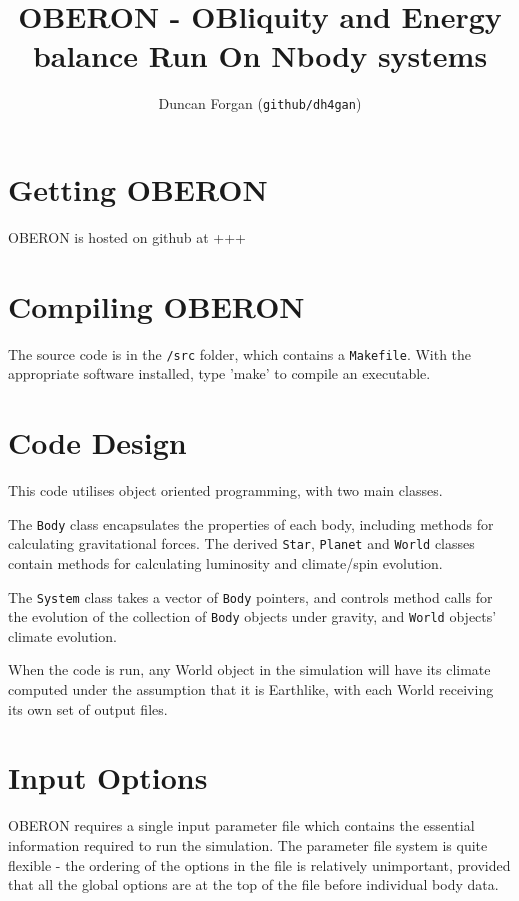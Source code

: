\documentclass[usenatbib,11pt]{article}
\begin{document}
\title{OBERON - OBliquity and Energy balance Run On Nbody systems}
\author{Duncan Forgan (\texttt{github/dh4gan})}
\maketitle

\newpage
\tableofcontents
\newpage

\section{Getting OBERON}

\noindent OBERON is hosted on github at +++

\section{Compiling OBERON}

\noindent The source code is in the \texttt{/src} folder, which contains a \texttt{Makefile}.  With the appropriate software installed, type 'make' to compile an executable.


\section{Code Design}

This code utilises object oriented programming, with two main classes.

The \texttt{Body} class encapsulates the properties of each body, including methods for calculating gravitational forces.  The derived \texttt{Star}, \texttt{Planet} and \texttt{World} classes contain methods for calculating luminosity and climate/spin evolution.

The \texttt{System} class takes a vector of \texttt{Body} pointers, and controls method calls for the evolution of the collection of \texttt{Body} objects under gravity, and \texttt{World} objects' climate evolution.

When the code is run, any World object in the simulation will have its climate computed under the assumption that it is Earthlike, with each World receiving its own set of output files.

\section{Input Options}

\noindent OBERON requires a single input parameter file which contains the essential information required to run the simulation.  The parameter file system is quite flexible - the ordering of the options in the file is relatively unimportant, provided that all the global options are at the top of the file before individual body data.
\end{document}
